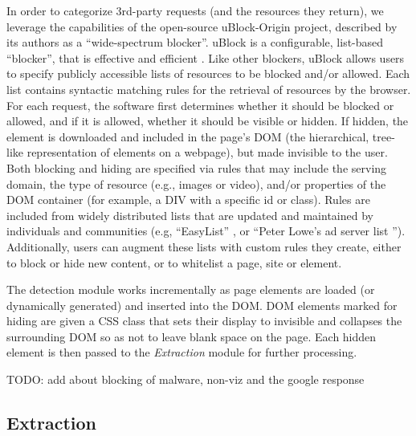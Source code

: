 \documentclass[conference]{IEEEtran}
\begin{document}
In order to categorize 3rd-party requests (and the resources they return), we leverage the capabilities of the open-source uBlock-Origin \cite{Gorhill} project, described by its authors as a “wide-spectrum blocker”. uBlock is a configurable, list-based “blocker”, that is effective and efficient \cite{Wills}. Like other blockers, uBlock allows users to specify publicly accessible lists of resources to be blocked and/or allowed. Each list contains syntactic matching rules for the retrieval of resources by the browser. For each request, the software first determines whether it should be blocked or allowed, and if it is allowed, whether it should be visible or hidden. If hidden, the element is downloaded and included in the page's DOM (the hierarchical, tree-like representation of elements on a webpage), but made invisible to the user. Both blocking and hiding are specified via rules that may include the serving domain, the type of resource (e.g., images or video), and/or properties of the DOM container (for example, a DIV with a specific id or class). Rules are included from widely distributed lists that are updated and maintained by individuals and communities (e.g, “EasyList” \cite{EasyList}, or “Peter Lowe's ad server list \cite{Lowe}”). Additionally, users can augment these lists with custom rules they create, either to block or hide new content, or to whitelist a page, site or element.

The detection module works incrementally as page elements are loaded (or dynamically generated) and inserted into the DOM. DOM elements marked for hiding are given a CSS class that sets their display to invisible and collapses the surrounding DOM so as not to leave blank space on the page. Each hidden element is then passed to the \emph{Extraction} module for further processing.

TODO: add about blocking of malware, non-viz and the google response

\subsection{Extraction}
\end{document}
